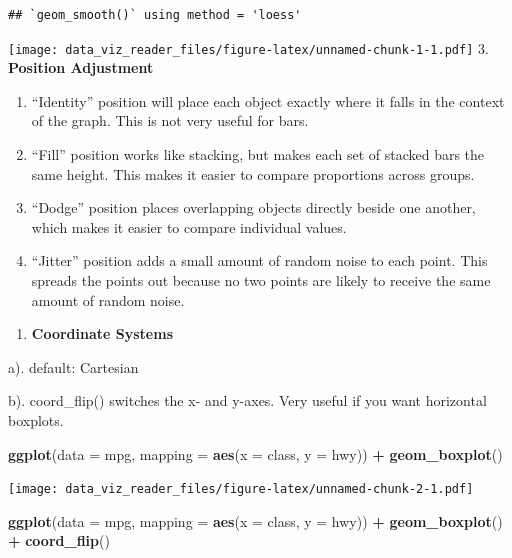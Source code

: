 \documentclass[]{book}
\newenvironment{Shaded}{\begin{snugshade}}{\end{snugshade}}
\newcommand{\KeywordTok}[1]{\textcolor[rgb]{0.13,0.29,0.53}{\textbf{#1}}}
\newcommand{\DataTypeTok}[1]{\textcolor[rgb]{0.13,0.29,0.53}{#1}}
\newcommand{\StringTok}[1]{\textcolor[rgb]{0.31,0.60,0.02}{#1}}
\newcommand{\OperatorTok}[1]{\textcolor[rgb]{0.81,0.36,0.00}{\textbf{#1}}}
\newcommand{\NormalTok}[1]{#1}
\providecommand{\tightlist}{%
  \setlength{\itemsep}{0pt}\setlength{\parskip}{0pt}}
\theoremstyle{definition}
\theoremstyle{definition}
\theoremstyle{definition}
\theoremstyle{remark}
\begin{document}
\begin{verbatim}
## `geom_smooth()` using method = 'loess'
\end{verbatim}

\texttt{[image: data\_viz\_reader\_files/figure-latex/unnamed-chunk-1-1.pdf]}
3. \textbf{Position Adjustment}

\begin{enumerate}
\def\labelenumi{\alph{enumi})}
\item
  ``Identity'' position will place each object exactly where it falls in
  the context of the graph. This is not very useful for bars.
\item
  ``Fill'' position works like stacking, but makes each set of stacked
  bars the same height. This makes it easier to compare proportions
  across groups.
\item
  ``Dodge'' position places overlapping objects directly beside one
  another, which makes it easier to compare individual values.
\item
  ``Jitter'' position adds a small amount of random noise to each point.
  This spreads the points out because no two points are likely to
  receive the same amount of random noise.
\end{enumerate}

\begin{enumerate}
\def\labelenumi{\arabic{enumi}.}
\setcounter{enumi}{3}
\tightlist
\item
  \textbf{Coordinate Systems}
\end{enumerate}

a). default: Cartesian

b). coord\_flip() switches the x- and y-axes. Very useful if you want
horizontal boxplots.

\begin{Shaded}
\begin{Highlighting}[]
\KeywordTok{ggplot}\NormalTok{(}\DataTypeTok{data =}\NormalTok{ mpg, }\DataTypeTok{mapping =} \KeywordTok{aes}\NormalTok{(}\DataTypeTok{x =}\NormalTok{ class, }\DataTypeTok{y =}\NormalTok{ hwy)) }\OperatorTok{+}\StringTok{ }\KeywordTok{geom_boxplot}\NormalTok{()}
\end{Highlighting}
\end{Shaded}

\texttt{[image: data\_viz\_reader\_files/figure-latex/unnamed-chunk-2-1.pdf]}

\begin{Shaded}
\begin{Highlighting}[]
\KeywordTok{ggplot}\NormalTok{(}\DataTypeTok{data =}\NormalTok{ mpg, }\DataTypeTok{mapping =} \KeywordTok{aes}\NormalTok{(}\DataTypeTok{x =}\NormalTok{ class, }\DataTypeTok{y =}\NormalTok{ hwy)) }\OperatorTok{+}\StringTok{  }\KeywordTok{geom_boxplot}\NormalTok{() }\OperatorTok{+}\StringTok{  }
\StringTok{  }\KeywordTok{coord_flip}\NormalTok{()}
\end{Highlighting}
\end{Shaded}
\end{document}
